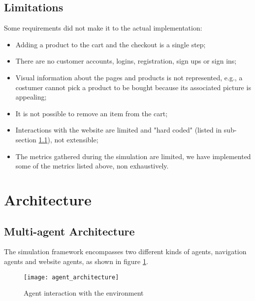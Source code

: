 \subsection{Limitations}

Some requirements did not make it to the actual implementation:

\begin{itemize}
    \item Adding a product to the cart and the checkout is a single step;
    \item There are no customer accounts, logins, registration, sign ups or 
    sign ins;
    \item Visual information about the pages and products is not represented, 
    e.g., a costumer cannot pick a product to be bought because its associated 
    picture is appealing;
    \item It is not possible to remove an item from the cart;
    \item Interactions with the website are limited and "hard coded" (listed 
    in sub-section \ref{ssec:multiagents}), not extensible;
    \item The metrics gathered during the simulation are limited, we have 
    implemented some of the metrics listed above, non exhaustively.
\end{itemize}

\section{Architecture}

\subsection{Multi-agent Architecture}\label{ssec:multiagents}

The simulation framework encompasses two different kinds of agents, navigation 
agents and website agents, as shown in figure \ref{fig:agent_arch}.

\begin{figure}[!h]
    \begin{center}
        \leavevmode
        \texttt{[image: agent\_architecture]}
        \caption{Agent interaction with the environment}
        \label{fig:agent_arch}
    \end{center}
\end{figure}

